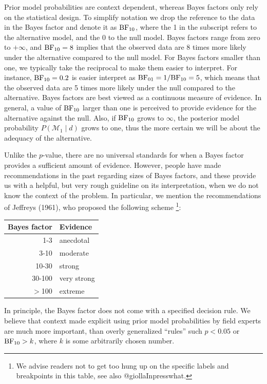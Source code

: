 \documentclass[english,,doc,floatsintext]{apa6}
\begin{document}
Prior model probabilities are context dependent, whereas Bayes factors only rely on the statistical design. To simplify notation we drop the reference to the data in the Bayes factor and denote it as \(\textnormal{BF}_{10}\), where the 1 in the subscript refers to the alternative model, and the 0 to the null model. Bayes factors range from zero to \(+ \infty\), and \(\textnormal{BF}_{10} = 8\) implies that the observed data are 8 times more likely under the alternative compared to the null model. For Bayes factors smaller than one, we typically take the reciprocal to make them easier to interpret. For instance, \(\textnormal{BF}_{10} = 0.2\) is easier interpret as \(\textnormal{BF}_{01} = 1/\textnormal{BF}_{10} = 5\), which means that the observed data are 5 times more likely under the null compared to the alternative. Bayes factors are best viewed as a continuous measure of evidence. In general, a value of \(\textnormal{BF}_{10}\) larger than one is perceived to provide evidence for the alternative against the null. Also, if \(\textnormal{BF}_{10}\) grows to \(\infty\), the posterior model probability \(P(\mathcal{M}_{1} \mid d)\) grows to one, thus the more certain we will be about the adequacy of the alternative.

Unlike the \(p\)-value, there are no universal standards for when a Bayes factor provides a sufficient amount of evidence. However, people have made recommendations in the past regarding sizes of Bayes factors, and these provide us with a helpful, but very rough guideline on its interpretation, when we do not know the context of the problem. In particular, we mention the recommendations of Jeffreys (1961), who proposed the following scheme
\footnote{We advise readers not to get too hung up on the specific labels and breakpoints in this table, see also @giollaInpresswhat.}:

\begin{center}
\begin{tabular}{rl}
Bayes factor & Evidence\\
\hline
1-3 & anecdotal\\
3-10 & moderate\\
10-30 & strong\\
30-100 & very strong\\
\( > \)100 & extreme\\
\end{tabular}
\end{center}

In principle, the Bayes factor does not come with a specified decision rule. We believe that context made explicit using prior model probabilities by field experts are much more important, than overly generalized ``rules'' such \(p < 0.05\) or \(\textnormal{BF} _{10} > k\), where \(k\) is some arbitrarily chosen number.
\end{document}
